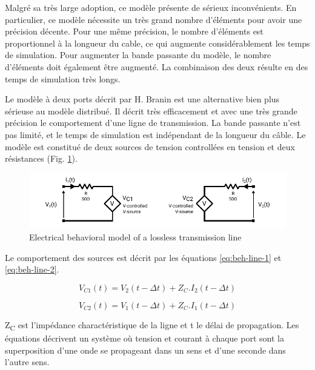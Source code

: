 Malgré sa très large adoption, ce modèle présente de sérieux inconvénients.
En particulier, ce modèle nécessite un très grand nombre d'éléments pour avoir une précision décente.
Pour une même précision, le nombre d'éléments est proportionnel à la longueur du cable, ce qui augmente considérablement les temps de simulation.
Pour augmenter la bande passante du modèle, le nombre d'éléments doit également être augmenté.
La combinaison des deux résulte en des temps de simulation très longs.

Le modèle à deux ports décrit par H. Branin \cite{branin-tl-ref} est une alternative bien plus sérieuse au modèle distribué.
Il décrit très efficacement et avec une très grande précision le comportement d'une ligne de transmission.
La bande passante n'est pas limité, et le temps de simulation est indépendant de la longueur du câble.
Le modèle est constitué de deux sources de tension controllées en tension et deux résistances (Fig. \ref{fig:beh-line-model}).

\begin{figure}[!h]
  \centering
  \includegraphics[width=\textwidth]{src/1/figures/behavioral_line_model.pdf}
  \caption{Electrical behavioral model of a lossless transmission line}
  \label{fig:beh-line-model}
\end{figure}

Le comportement des sources est décrit par les équations \ref{eq:beh-line-1} et \ref{eq:beh-line-2}.

\begin{equation}
V_{C1}(t) = V_{2}(t - \Delta t) + Z_{C}.I_{2}(t - \Delta t)
\label{eq:beh-line-1}
\end{equation}

\begin{equation}
V_{C2}(t) = V_{1}(t - \Delta t) + Z_{C}.I_{1}(t - \Delta t)
\label{eq:beh-line-2}
\end{equation}

Z\textsubscript{C} est l'impédance charactéristique de la ligne et \textDelta{}t le délai de propagation.
Les équations décrivent un système où tension et courant à chaque port sont la superposition d'une onde se propageant dans un sens et d'une seconde dans l'autre sens.

